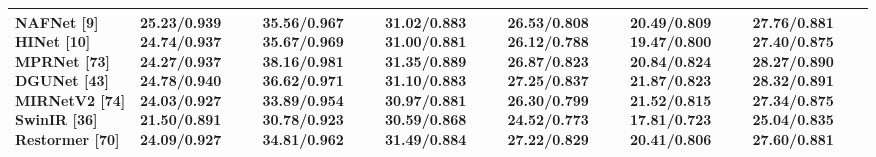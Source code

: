 \begin{tabular}{lllllll}
\toprule
NAFNet [9] HINet [10] MPRNet [73] DGUNet [43] MIRNetV2 [74] SwinIR [36] Restormer [70] & 25.23/0.939 24.74/0.937 24.27/0.937 24.78/0.940 24.03/0.927 21.50/0.891 24.09/0.927 & 35.56/0.967 35.67/0.969 38.16/0.981 36.62/0.971 33.89/0.954 30.78/0.923 34.81/0.962 & 31.02/0.883 31.00/0.881 31.35/0.889 31.10/0.883 30.97/0.881 30.59/0.868 31.49/0.884 & 26.53/0.808 26.12/0.788 26.87/0.823 27.25/0.837 26.30/0.799 24.52/0.773 27.22/0.829 & 20.49/0.809 19.47/0.800 20.84/0.824 21.87/0.823 21.52/0.815 17.81/0.723 20.41/0.806 & 27.76/0.881 27.40/0.875 28.27/0.890 28.32/0.891 27.34/0.875 25.04/0.835 27.60/0.881 \\
\midrule
\bottomrule
\end{tabular}
